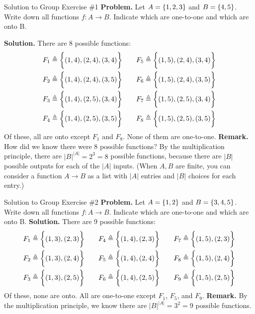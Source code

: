 \documentclass[10pt]{beamer}
\begin{document}
\begin{frame}{Solution to Group Exercise \#1}
\small 
\textbf{Problem.} Let $A=\{ {1,2,3} \}$ and $B=\{ {4,5} \}$.  Write down all functions $f: A \to B$. Indicate which are one-to-one and which are onto B.

\vfill 
\textbf{Solution.} There are 8 possible functions:
\begin{align*}
F_1 & \triangleq \bigg\{ (1,4), (2,4), (3,4) \bigg\} & \quad F_5 & \triangleq \bigg\{ (1,5), (2,4), (3,4) \bigg\} \\
F_2 & \triangleq \bigg\{ (1,4), (2,4), (3,5) \bigg\} & \quad F_6 & \triangleq \bigg\{ (1,5), (2,4), (3,5) \bigg\} \\
F_3 & \triangleq \bigg\{ (1,4), (2,5), (3,4) \bigg\} & \quad F_7 & \triangleq \bigg\{ (1,5), (2,5), (3,4) \bigg\} \\
F_4 & \triangleq \bigg\{ (1,4), (2,5), (3,5) \bigg\} & \quad F_8 & \triangleq \bigg\{ (1,5), (2,5), (3,5) \bigg\}
\end{align*}
%
Of these, all are onto except $F_1$ and $F_8$.   None of them are one-to-one.
\vfill
\textbf{Remark.} How did we know there were 8 possible functions? \pause   By the multiplication principle, there are $|B|^{|A|} = 2^3=8$ possible functions, because there are $|B|$ possible outputs for each of the $|A|$ inputs.   (When $A,B$ are finite, you can consider a function $A \to B$ as a \alert{list} with $|A|$ entries and $|B|$ choices for each entry.)
\end{frame}


\begin{frame}{Solution to Group Exercise \#2}
\small 
\textbf{Problem.}  Let $A=\{ {1,2} \}$ and $B=\{ {3, 4,5} \}$.  Write down all functions $f: A \to B$. Indicate which are one-to-one and which are onto B.
\vfill 
\textbf{Solution.} There are 9 possible functions:
\begin{align*}
F_1 & \triangleq \bigg\{ (1,3), (2,3) \bigg\} & \quad F_4 & \triangleq \bigg\{ (1,4), (2,3) \bigg\} & \quad F_7 & \triangleq \bigg\{ (1,5), (2,3) \bigg\} \\
F_2 & \triangleq \bigg\{ (1,3), (2,4) \bigg\} & \quad F_5 & \triangleq \bigg\{ (1,4), (2,4) \bigg\} & \quad F_8 & \triangleq \bigg\{ (1,5), (2,4) \bigg\} \\
F_3 & \triangleq \bigg\{ (1,3), (2,5) \bigg\} & \quad F_6 & \triangleq \bigg\{ (1,4), (2,5) \bigg\} & \quad F_9 & \triangleq \bigg\{ (1,5), (2,5) \bigg\} \\
\end{align*}
%
Of these, none are onto.  All are one-to-one except $F_1$, $F_5$, and $F_9$.
\vfill
\textbf{Remark.} By the multiplication principle, we know there are $|B|^{|A|} = 3^2 = 9$ possible functions.
\end{frame}
\end{document}
